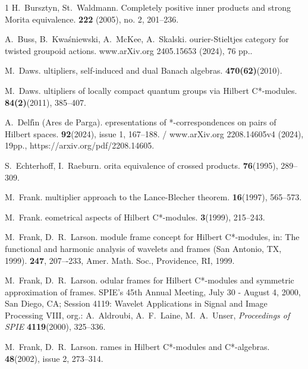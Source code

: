 \documentclass{amsart}
\theoremstyle{definition}
\begin{document}
\begin{thebibliography}{1}
{\sc H.~Bursztyn, St.~Waldmann}.
\newblock Completely positive inner products and strong Morita equivalence.
 {\bf 222} (2005), no. 2, 201--236.

{\sc A.~Buss, B.~Kwa\'sniewski, A.~McKee, A.~Skalski}.
ourier-{S}tieltjes category for twisted groupoid actions.
\newblock www.arXiv.org 2405.15653 (2024), 76 pp..

{\sc M.~Daws}.
ultipliers, self-induced and dual Banach algebras.
 {\bf 470(62)}(2010).

{\sc M.~Daws}.
ultipliers of locally compact quantum groups via {H}ilbert {C}*-modules.
 {\bf 84(2)}(2011), 385--407.

{\sc A.~Delf{\'{\i}}n (Ares de Parga)}.
epresentations of *-correspondences on pairs of {H}ilbert spaces.
 {\bf 92}(2024), issue 1, 167--188. / www.arXiv.org  2208.14605v4 (2024), 19pp., https://arxiv.org/pdf/2208.14605. 

{\sc S.~Echterhoff, I.~Raeburn}.
orita equivalence of crossed products.
 {\bf 76}(1995), 289--309.

{\sc M.~Frank}.
 multiplier approach to the {L}ance-{B}lecher theorem.
 {\bf 16}(1997), 565--573.

{\sc M.~Frank}.
eometrical aspects of {H}ilbert {C}*-modules. 
 {\bf 3}(1999), 215--243.

{\sc M.~Frank, D.~R.~Larson}.
 module frame concept for {H}ilbert {C}*-modules,  in: The functional and harmonic analysis of wavelets and frames (San Antonio, TX, 1999).
 {\bf 247}, 207–-233, Amer. Math. Soc., Providence, RI, 1999.

{\sc M.~Frank, D.~R.~Larson}.
odular frames for {H}ilbert {C}*-modules and symmetric approximation of frames.
\newblock  SPIE's 45th Annual Meeting, July 30 - August 4, 2000, San Diego, CA; Session 4119: Wavelet Applications in Signal and Image Processing VIII, org.: A.~Aldroubi, A.~F.~Laine, M.~A.~Unser, {\em Proceedings of SPIE} {\bf 4119}(2000), 325--336.

{\sc M.~Frank, D.~R.~Larson}.
rames in {H}ilbert {C}*-modules and {C}*-algebras.
 {\bf 48}(2002), issue 2, 273--314.


\end{thebibliography}
\end{document}
